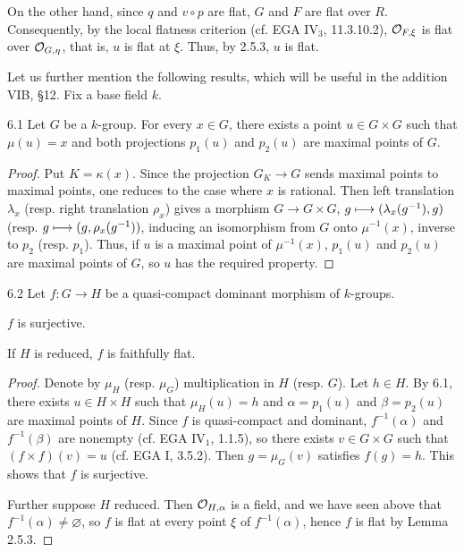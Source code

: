 On the other hand, since $q$ and $v\circ p$ are flat, $G$ and $F$ are flat over $R$. Consequently, by the local flatness criterion (cf. EGA IV$_3$, 11.3.10.2), $\mathcal{O}_{F,\xi}$ is flat over $\mathcal{O}_{G,\eta}$, that is, $u$ is flat at $\xi$. Thus, by 2.5.3, $u$ is flat.

Let us further mention the following results, which will be useful in the addition VIB, §12. Fix a base field $k$.
\begin{lemma}{6.1}\label{VIA.6.1}
Let $G$ be a $k$-group. For every $x\in G$, there exists a point $u\in G\times G$ such that $\mu(u)=x$ and both projections $p_1(u)$ and $p_2(u)$ are maximal points of $G$.
\end{lemma}
\begin{proof}
Put $K=\kappa(x)$. Since the projection $G_K\to G$ sends maximal points to maximal points, one reduces to the case where $x$ is rational. Then left translation $\lambda_x$ (resp. right translation $\rho_x$) gives a morphism $G\to G\times G$, $g\longmapsto(\lambda_x(g^{-1}),g)$ (resp. $g\longmapsto(g,\rho_x(g^{-1}))$, inducing an isomorphism from $G$ onto $\mu^{-1}(x)$, inverse to $p_2$ (resp. $p_1$). Thus, if $u$ is a maximal point of $\mu^{-1}(x)$, $p_1(u)$ and $p_2(u)$ are maximal points of $G$, so $u$ has the required property.
\end{proof}
\begin{corollary}{6.2}\label{VIA.6.2}
Let $f:G\to H$ be a quasi-compact dominant morphism of $k$-groups.
\begin{enumeratei}
\item $f$ is surjective.
\item If $H$ is reduced, $f$ is faithfully flat.
\end{enumeratei}
\end{corollary}
\begin{proof}
Denote by $\mu_H$ (resp. $\mu_G$) multiplication in $H$ (resp. $G$). Let $h\in H$. By 6.1, there exists $u\in H\times H$ such that $\mu_H(u)=h$ and $\alpha=p_1(u)$ and $\beta=p_2(u)$ are maximal points of $H$. Since $f$ is quasi-compact and dominant, $f^{-1}(\alpha)$ and $f^{-1}(\beta)$ are nonempty (cf. EGA IV$_1$, 1.1.5), so there exists $v\in G\times G$ such that $(f\times f)(v)=u$ (cf. EGA I, 3.5.2). Then $g=\mu_G(v)$ satisfies $f(g)=h$. This shows that $f$ is surjective.

Further suppose $H$ reduced. Then $\mathcal{O}_{H,\alpha}$ is a field, and we have seen above that $f^{-1}(\alpha)\ne\varnothing$, so $f$ is flat at every point $\xi$ of $f^{-1}(\alpha)$, hence $f$ is flat by Lemma 2.5.3.
\end{proof}
